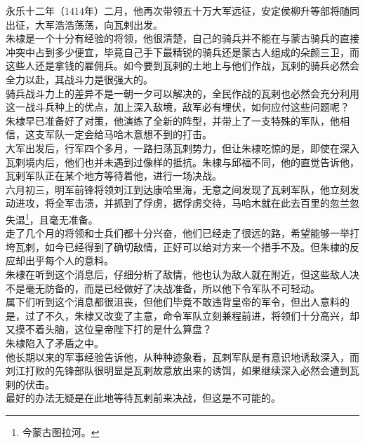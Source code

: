 \begin{multicols}{\theparacolNo}
永乐十二年（1414年）二月，他再次带领五十万大军远征，安定侯柳升等部将随同出征，大军浩浩荡荡，向瓦剌出发。\\

朱棣是一个十分有经验的将领，他很清楚，自己的骑兵并不能在与蒙古骑兵的直接冲突中占到多少便宜，毕竟自己手下最精锐的骑兵还是蒙古人组成的朵颜三卫，而这些人还是拿钱的雇佣兵。如今要到瓦剌的土地上与他们作战，瓦剌的骑兵必然会全力以赴，其战斗力是很强大的。\\

骑兵战斗力上的差异不是一朝一夕可以解决的，全民作战的瓦剌也必然会充分利用这一战斗兵种上的优点，加上深入敌境，敌军必有埋伏，如何应付这些问题呢？\\

朱棣早已准备好了对策，他演练了全新的阵型，并带上了一支特殊的军队，他相信，这支军队一定会给马哈木意想不到的打击。\\

大军出发后，行军四个多月，一路扫荡瓦剌势力，但让朱棣吃惊的是，即使在深入瓦剌境内后，他们也并未遇到过像样的抵抗。朱棣与邱福不同，他的直觉告诉他，瓦剌军队正在某个地方等待着他，进行一场决战。\\

六月初三，明军前锋将领刘江到达康哈里海，无意之间发现了瓦剌军队，他立刻发动进攻，将全军击溃，并抓到了俘虏，据俘虏交待，马哈木就在此去百里的忽兰忽失温\footnote{今蒙古图拉河。}，且毫无准备。\\

走了几个月的将领和士兵们都十分兴奋，他们已经走了很远的路，希望能够一举打垮瓦剌，如今已经得到了确切敌情，正好可以给对方来一个措手不及。但朱棣的反应却出乎每个人的意料。\\

朱棣在听到这个消息后，仔细分析了敌情，他也认为敌人就在附近，但这些敌人决不是毫无防备的，而是已经做好了决战准备，所以他下令军队不可轻动。\\

属下们听到这个消息都很沮丧，但他们毕竟不敢违背皇帝的军令，但出人意料的是，过了不久，朱棣又改变了主意，命令军队立刻兼程前进，将领们十分高兴，却又摸不着头脑，这位皇帝陛下打的是什么算盘？\\

朱棣陷入了矛盾之中。\\

他长期以来的军事经验告诉他，从种种迹象看，瓦剌军队是有意识地诱敌深入，而刘江打败的先锋部队很明显是瓦剌故意放出来的诱饵，如果继续深入必然会遭到瓦剌的伏击。\\

最好的办法无疑是在此地等待瓦剌前来决战，但这是不可能的。\\


\end{multicols}
